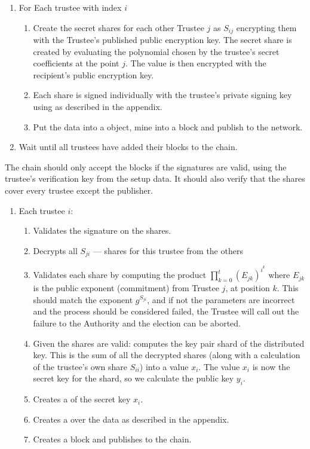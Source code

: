 \begin{enumerate}
    \item For Each trustee with index $i$
          \begin{enumerate}
              \item Create the secret shares for each other Trustee $j$ as $S_{ij}$ encrypting them with the Trustee's published public encryption key. The secret share is created by evaluating the polynomial chosen by the trustee's secret coefficients at the point $j$. The value is then encrypted with the recipient's public encryption key.
              \item Each share is signed individually with the trustee's private signing key using as described in the appendix.
              \item Put the data into a  object, mine into a block and publish to the network.
          \end{enumerate}
    \item Wait until all trustees have added their blocks to the chain.
\end{enumerate}

The chain should only accept the blocks if the signatures are valid, using the trustee's verification key from the setup data. It should also verify that the shares cover every trustee except the publisher.

\begin{enumerate}
    \item Each trustee $i$:
          \begin{enumerate}
              \item Validates the signature on the shares.
              \item Decrypts all $S_{ji}$ --- shares for this trustee from the others
              \item Validates each share by computing the product $\prod\limits_{k=0}^{t} (E_{jk})^{i^{k}}$ where $E_{jk}$ is the public exponent (commitment) from Trustee $j$, at position ${k}$. This should match the exponent $g^{S_{ji}}$, and if not the parameters are incorrect and the process should be considered failed, the Trustee will call out the failure to the Authority and the election can be aborted.
              \item Given the shares are valid: computes the key pair shard of the distributed key. This is the sum of all the decrypted shares (along with a calculation of the trustee's own share $S_{ii}$) into a value $x_i$. The value $x_i$ is now the secret key for the shard, so we calculate the public key $y_i$.
              \item Creates a  of the secret key $x_i$.
              \item Creates a  over the data as described in the appendix.
              \item Creates a  block and publishes to the chain.
          \end{enumerate}
\end{enumerate}


